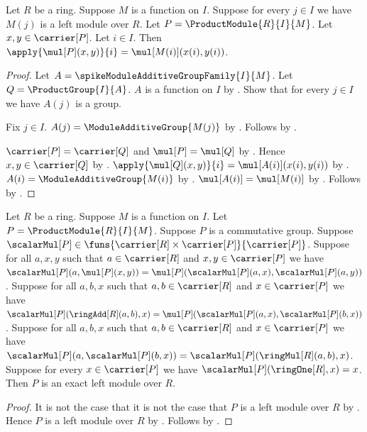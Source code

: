 \begin{proposition}\label{spike_product_module_add_coordinate}
    Let $R$ be a ring.
    Suppose $M$ is a function on $I$.
    Suppose for every $j\in I$ we have $M(j)$ is a left module over $R$.
    Let $P=\ProductModule{R}{I}{M}$.
    Let $x,y\in\carrier[P]$.
    Let $i\in I$.
    Then
        $\apply{\mul[P](x,y)}{i}=\mul[M(i)](x(i),y(i))$.
\end{proposition}
\begin{proof}
    Let $A=\spikeModuleAdditiveGroupFamily{I}{M}$.
    Let $Q=\ProductGroup{I}{A}$.
    $A$ is a function on $I$ by
        .
    Show that for every $j\in I$ we have $A(j)$ is a group.
    \begin{subproof}
        Fix $j\in I$.
        $A(j)=\ModuleAdditiveGroup{M(j)}$ by
            .
        Follows by
            .
    \end{subproof}
    $\carrier[P]=\carrier[Q]$ and $\mul[P]=\mul[Q]$ by
        .
    Hence $x,y\in\carrier[Q]$ by \auto.
    $\apply{\mul[Q](x,y)}{i}=\mul[A(i)](x(i),y(i))$ by
        .
    $A(i)=\ModuleAdditiveGroup{M(i)}$ by
        .
    $\mul[A(i)]=\mul[M(i)]$ by
        .
    Follows by \auto.
\end{proof}

\begin{theorem}\label{spike_product_module_intro}
    Let $R$ be a ring.
    Suppose $M$ is a function on $I$.
    Let $P=\ProductModule{R}{I}{M}$.
    Suppose $P$ is a commutative group.
    Suppose
        $\scalarMul[P]\in
            \funs{\carrier[R]\times\carrier[P]}{\carrier[P]}$.
    Suppose for all $a,x,y$ such that $a\in\carrier[R]$ and
        $x,y\in\carrier[P]$ we have
        $\scalarMul[P](a,\mul[P](x,y))
            =\mul[P](\scalarMul[P](a,x),\scalarMul[P](a,y))$.
    Suppose for all $a,b,x$ such that $a,b\in\carrier[R]$ and
        $x\in\carrier[P]$ we have
        $\scalarMul[P](\ringAdd[R](a,b),x)
            =\mul[P](\scalarMul[P](a,x),\scalarMul[P](b,x))$.
    Suppose for all $a,b,x$ such that $a,b\in\carrier[R]$ and
        $x\in\carrier[P]$ we have
        $\scalarMul[P](a,\scalarMul[P](b,x))
            =\scalarMul[P](\ringMul[R](a,b),x)$.
    Suppose for every $x\in\carrier[P]$ we have
        $\scalarMul[P](\ringOne[R],x)=x$.
    Then $P$ is an exact left module over $R$.
\end{theorem}
\begin{proof}
    It is not the case that it is not the case that
        $P$ is a left module over $R$ by
        .
    Hence $P$ is a left module over $R$ by \auto.
    Follows by
        .
\end{proof}

